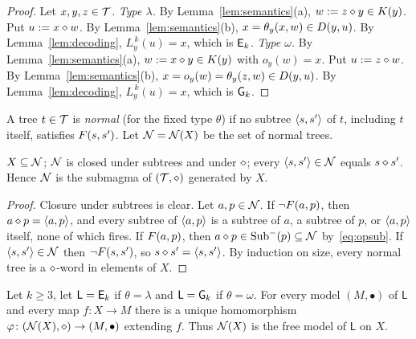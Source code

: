 \begin{proof}
Let $x,y,z\in\mathcal{T}$.
\emph{Type $\lambda$.} By Lemma~\ref{lem:semantics}(a), $w:=z\mathbin{\diamond} y\in K(y)$.
Put $u:=x\mathbin{\diamond} w$. By Lemma~\ref{lem:semantics}(b), $x=\theta_y(x,w)\in D(y,u)$.
By Lemma~\ref{lem:decoding}, $L_y^{\,k}(u)=x$, which is $\mathsf{E}_{k}$.
\emph{Type $\omega$.} By Lemma~\ref{lem:semantics}(a), $w:=x\mathbin{\diamond} y\in K(y)$ with
$o_y(w)=x$. Put $u:=z\mathbin{\diamond} w$. By Lemma~\ref{lem:semantics}(b),
$x=o_y(w)=\theta_y(z,w)\in D(y,u)$. By Lemma~\ref{lem:decoding},
$L_y^{\,k}(u)=x$, which is $\mathsf{G}_{k}$.
\end{proof}

\begin{definition}\label{def:normal}
A tree $t\in\mathcal{T}$ is \emph{normal} (for the fixed type $\theta$) if no subtree
$\langle s,s'\rangle$ of $t$, including $t$ itself, satisfies $F(s,s')$. Let
$\mathcal{N}=\mathcal{N}(X)$ be the set of normal trees.
\end{definition}

\begin{lemma}\label{lem:normal}
$X\subseteq\mathcal{N}$; $\mathcal{N}$ is closed under subtrees and under $\mathbin{\diamond}$; every
$\langle s,s'\rangle\in\mathcal{N}$ equals $s\mathbin{\diamond} s'$. Hence $\mathcal{N}$ is the submagma of
$(\mathcal{T},\mathbin{\diamond})$ generated by $X$.
\end{lemma}

\begin{proof}
Closure under subtrees is clear. Let $a,p\in\mathcal{N}$. If $\neg F(a,p)$, then
$a\mathbin{\diamond} p=\langle a,p\rangle$, and every subtree of $\langle a,p\rangle$ is a subtree of $a$, a
subtree of $p$, or $\langle a,p\rangle$ itself, none of which fires. If $F(a,p)$,
then $a\mathbin{\diamond} p\in\operatorname{Sub}^{-}(p)\subseteq\mathcal{N}$ by~\eqref{eq:opsub}. If
$\langle s,s'\rangle\in\mathcal{N}$ then $\neg F(s,s')$, so $s\mathbin{\diamond} s'=\langle s,s'\rangle$. By
induction on size, every normal tree is a $\mathbin{\diamond}$-word in elements of $X$.
\end{proof}

\begin{theorem}[Freeness]\label{thm:free}
Let $k\ge3$, let $\mathsf{L}=\mathsf{E}_{k}$ if $\theta=\lambda$ and $\mathsf{L}=\mathsf{G}_{k}$
if $\theta=\omega$. For every model $(M,\bullet)$ of $\mathsf{L}$ and every map
$f\colon X\to M$ there is a unique homomorphism
$\varphi\colon(\mathcal{N}(X),\mathbin{\diamond})\to(M,\bullet)$ extending $f$. Thus $\mathcal{N}(X)$ is the free
model of $\mathsf{L}$ on $X$.
\end{theorem}

